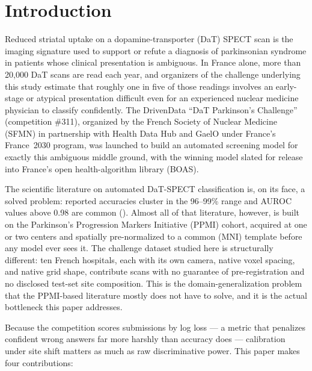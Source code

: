 \documentclass[10pt]{article}
\begin{document}
\section{Introduction}
\label{sec:intro}

Reduced striatal uptake on a dopamine-transporter (DaT) SPECT scan is the imaging signature used to support or refute a diagnosis of parkinsonian syndrome in patients whose clinical presentation is ambiguous. In France alone, more than 20{,}000 DaT scans are read each year, and organizers of the challenge underlying this study estimate that roughly one in five of those readings involves an early-stage or atypical presentation difficult even for an experienced nuclear medicine physician to classify confidently. The DrivenData ``DaT Parkinson's Challenge'' (competition \#311), organized by the French Society of Nuclear Medicine (SFMN) in partnership with Health Data Hub and GaelO under France's France~2030 program, was launched to build an automated screening model for exactly this ambiguous middle ground, with the winning model slated for release into France's open health-algorithm library (BOAS).

The scientific literature on automated DaT-SPECT classification is, on its face, a solved problem: reported accuracies cluster in the 96--99\% range and AUROC values above 0.98 are common (). Almost all of that literature, however, is built on the Parkinson's Progression Markers Initiative (PPMI) cohort, acquired at one or two centers and spatially pre-normalized to a common (MNI) template before any model ever sees it. The challenge dataset studied here is structurally different: ten French hospitals, each with its own camera, native voxel spacing, and native grid shape, contribute scans with no guarantee of pre-registration and no disclosed test-set site composition. This is the domain-generalization problem that the PPMI-based literature mostly does not have to solve, and it is the actual bottleneck this paper addresses.

Because the competition scores submissions by log loss --- a metric that penalizes confident wrong answers far more harshly than accuracy does --- calibration under site shift matters as much as raw discriminative power. This paper makes four contributions:
\end{document}

